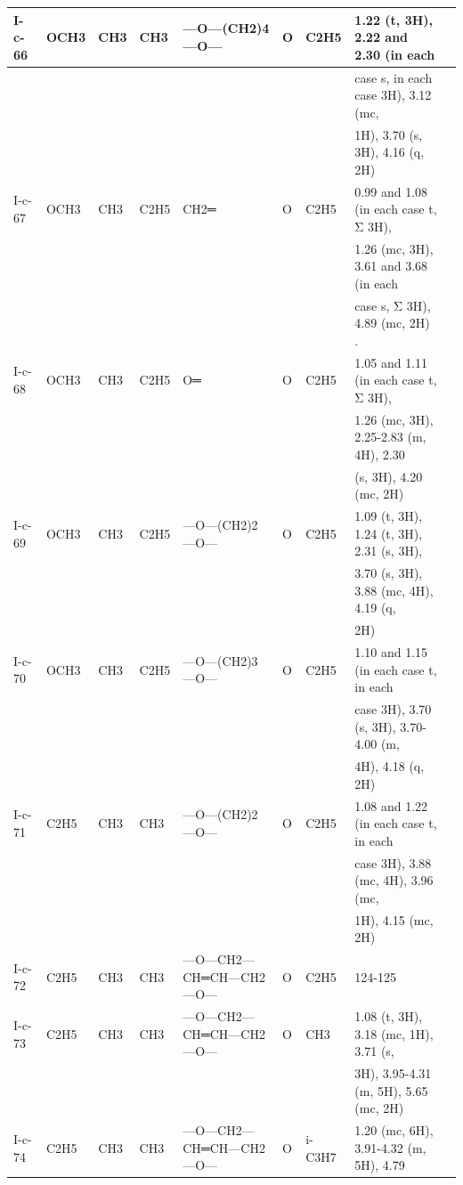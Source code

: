 \documentclass[11pt,a4paper]{article}
\begin{document}
\begin{table}[h]
\begin{tabular}{|l|l|l|l|l|l|l|l|l|}
I-c-66 & OCH3 & CH3 & CH3 & —O—(CH2)4—O— & O & C2H5 & 1.22 (t, 3H), 2.22 and 2.30 (in each &  \\ \hline
 &  &  &  &  &  &  & case s, in each case 3H), 3.12 (mc, &  \\ \hline
 &  &  &  &  &  &  & 1H), 3.70 (s, 3H), 4.16 (q, 2H) &  \\ \hline
I-c-67 & OCH3 & CH3 & C2H5 & CH2═ & O & C2H5 & 0.99 and 1.08 (in each case t, Σ 3H), &  \\ \hline
 &  &  &  &  &  &  & 1.26 (mc, 3H), 3.61 and 3.68 (in each &  \\ \hline
 &  &  &  &  &  &  & case s, Σ 3H), 4.89 (mc, 2H) . &  \\ \hline
I-c-68 & OCH3 & CH3 & C2H5 & O═ & O & C2H5 & 1.05 and 1.11 (in each case t, Σ 3H), &  \\ \hline
 &  &  &  &  &  &  & 1.26 (mc, 3H), 2.25-2.83 (m, 4H), 2.30 &  \\ \hline
 &  &  &  &  &  &  & (s, 3H), 4.20 (mc, 2H) &  \\ \hline
I-c-69 & OCH3 & CH3 & C2H5 & —O—(CH2)2—O— & O & C2H5 & 1.09 (t, 3H), 1.24 (t, 3H), 2.31 (s, 3H), &  \\ \hline
 &  &  &  &  &  &  & 3.70 (s, 3H), 3.88 (mc, 4H), 4.19 (q, &  \\ \hline
 &  &  &  &  &  &  & 2H) &  \\ \hline
I-c-70 & OCH3 & CH3 & C2H5 & —O—(CH2)3—O— & O & C2H5 & 1.10 and 1.15 (in each case t, in each &  \\ \hline
 &  &  &  &  &  &  & case 3H), 3.70 (s, 3H), 3.70-4.00 (m, &  \\ \hline
 &  &  &  &  &  &  & 4H), 4.18 (q, 2H) &  \\ \hline
I-c-71 & C2H5 & CH3 & CH3 & —O—(CH2)2—O— & O & C2H5 & 1.08 and 1.22 (in each case t, in each &  \\ \hline
 &  &  &  &  &  &  & case 3H), 3.88 (mc, 4H), 3.96 (mc, &  \\ \hline
 &  &  &  &  &  &  & 1H), 4.15 (mc, 2H) &  \\ \hline
I-c-72 & C2H5 & CH3 & CH3 & —O—CH2—CH═CH—CH2—O— & O & C2H5 & 124-125 &  \\ \hline
I-c-73 & C2H5 & CH3 & CH3 & —O—CH2—CH═CH—CH2—O— & O & CH3 & 1.08 (t, 3H), 3.18 (mc, 1H), 3.71 (s, &  \\ \hline
 &  &  &  &  &  &  & 3H), 3.95-4.31 (m, 5H), 5.65 (mc, 2H) &  \\ \hline
I-c-74 & C2H5 & CH3 & CH3 & —O—CH2—CH═CH—CH2—O— & O & i-C3H7 & 1.20 (mc, 6H), 3.91-4.32 (m, 5H), 4.79 &  \\ \hline

\end{tabular}
\end{table}
\end{document}
